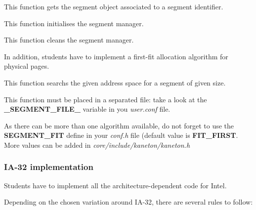 
This  function  gets  the  segment  object  associated  to  a  segment
identifier.


This function initialises the segment manager.


This function cleans the segment manager.

In  addition,  students  have  to  implement  a  first-fit  allocation
algorithm for physical pages.


This function searchs  the given address space for  a segment of given
size.

This function must  be placed in a separated file: take  a look at the
\textbf{\_SEGMENT\_FILE\_} variable in you \textit{user.conf} file.

As there  can be more than  one algorithm available, do  not forget to
use  the  \textbf{SEGMENT\_FIT} define  in  your \textit{conf.h}  file
(default  value is \textbf{FIT\_FIRST}.  More values  can be  added in
\textit{core/include/kaneton/kaneton.h}

\subsubsection{IA-32 implementation}

Students  have to  implement all  the architecture-dependent  code for
Intel.

Depending  on the  chosen variation  around IA-32,  there  are several
rules to follow:

